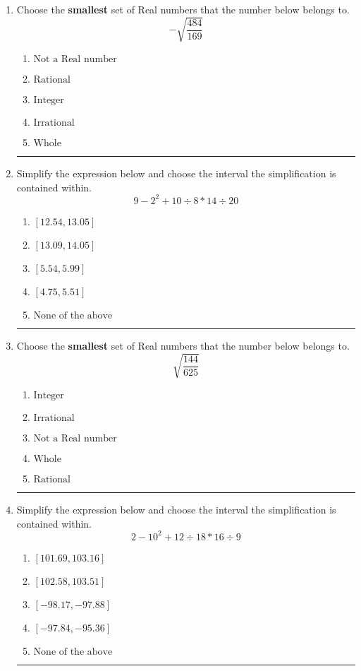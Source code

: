 \documentclass[14pt]{extbook}
\newcommand{\litem}[1]{\item#1\hspace*{-1cm}\rule{\textwidth}{0.4pt}}
\begin{document}
\begin{enumerate}
{\begin{enumerate}[label=\Alph*.]
\end{enumerate} }
\litem{
Choose the \textbf{smallest} set of Real numbers that the number below belongs to.\[ -\sqrt{\frac{484}{169}} \]\begin{enumerate}[label=\Alph*.]
\item \( \text{Not a Real number} \)
\item \( \text{Rational} \)
\item \( \text{Integer} \)
\item \( \text{Irrational} \)
\item \( \text{Whole} \)

\end{enumerate} }
\litem{
Simplify the expression below and choose the interval the simplification is contained within.\[ 9 - 2^2 + 10 \div 8 * 14 \div 20 \]\begin{enumerate}[label=\Alph*.]
\item \( [12.54, 13.05] \)
\item \( [13.09, 14.05] \)
\item \( [5.54, 5.99] \)
\item \( [4.75, 5.51] \)
\item \( \text{None of the above} \)

\end{enumerate} }
\litem{
Choose the \textbf{smallest} set of Real numbers that the number below belongs to.\[ \sqrt{\frac{144}{625}} \]\begin{enumerate}[label=\Alph*.]
\item \( \text{Integer} \)
\item \( \text{Irrational} \)
\item \( \text{Not a Real number} \)
\item \( \text{Whole} \)
\item \( \text{Rational} \)

\end{enumerate} }
\litem{
Simplify the expression below and choose the interval the simplification is contained within.\[ 2 - 10^2 + 12 \div 18 * 16 \div 9 \]\begin{enumerate}[label=\Alph*.]
\item \( [101.69, 103.16] \)
\item \( [102.58, 103.51] \)
\item \( [-98.17, -97.88] \)
\item \( [-97.84, -95.36] \)
\item \( \text{None of the above} \)


\end{enumerate}}
\end{enumerate}
\end{document}
